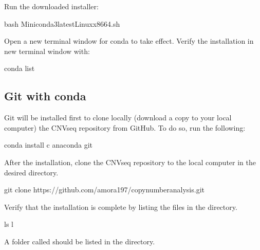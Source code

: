 \documentclass[letterpaper,10pt,english]{sphinxhowto}
\begin{document}
Run the downloaded installer:

\begin{sphinxVerbatim}[commandchars=\\\{\}]
\PYGZdl{} bash Miniconda3\PYGZhy{}latest\PYGZhy{}Linux\PYGZhy{}x86\PYGZus{}64.sh
\end{sphinxVerbatim}

Open a new terminal window for conda to take effect. Verify the installation in new terminal window with:

\begin{sphinxVerbatim}[commandchars=\\\{\}]
\PYGZdl{} conda list
\end{sphinxVerbatim}


\subsection{Git with conda}
\label{\detokenize{index:git-with-conda}}
Git will be installed first to clone locally (download a copy to your local computer) the CNV\sphinxhyphen{}seq repository from GitHub. To do so, run the following:

\begin{sphinxVerbatim}[commandchars=\\\{\}]
\PYGZdl{} conda install \PYGZhy{}c anaconda git
\end{sphinxVerbatim}

After the installation, clone the CNV\sphinxhyphen{}seq repository to the local computer in the desired directory.

\begin{sphinxVerbatim}[commandchars=\\\{\}]
\PYGZdl{} git clone https://github.com/amora197/copy\PYGZhy{}number\PYGZhy{}analysis.git
\end{sphinxVerbatim}

Verify that the installation is complete by listing the files in the directory.

\begin{sphinxVerbatim}[commandchars=\\\{\}]
\PYGZdl{} ls \PYGZhy{}l
\end{sphinxVerbatim}

A folder called  should be listed in the directory.
\end{document}
